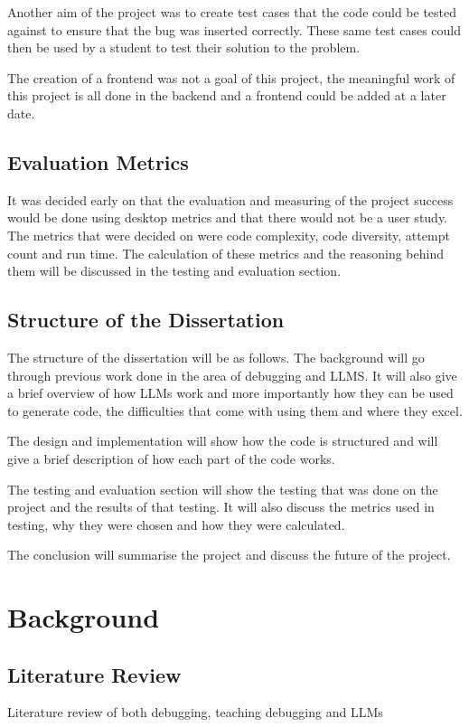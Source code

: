 \documentclass[12pt]{extarticle}
\begin{document}
Another aim of the project was to create test cases that the code could be tested against to ensure that the bug was inserted correctly. These same test cases could then be used by a student to test their solution to the problem.

The creation of a frontend was not a goal of this project, the meaningful work of this project is all done in the backend and a frontend could be added at a later date.

\subsection{Evaluation Metrics}

It was decided early on that the evaluation and measuring of the project success would be done using desktop metrics and that there would not be a user study. The metrics that were decided on were code complexity, code diversity, attempt count and run time. The calculation of these metrics and the reasoning behind them will be discussed in the testing and evaluation section.

\subsection{Structure of the Dissertation}

The structure of the dissertation will be as follows. The background will go through previous work done in the area of debugging and LLMS. It will also give a brief overview of how LLMs work and more importantly how they can be used to generate code, the difficulties that come with using them and where they excel. 

The design and implementation will show how the code is structured and will give a brief description of how each part of the code works.

The testing and evaluation section will show the testing that was done on the project and the results of that testing. It will also discuss the metrics used in testing, why they were chosen and how they were calculated.

The conclusion will summarise the project and discuss the future of the project.

\section{Background}

\subsection{Literature Review}
Literature review of both debugging, teaching debugging and LLMs
\end{document}
